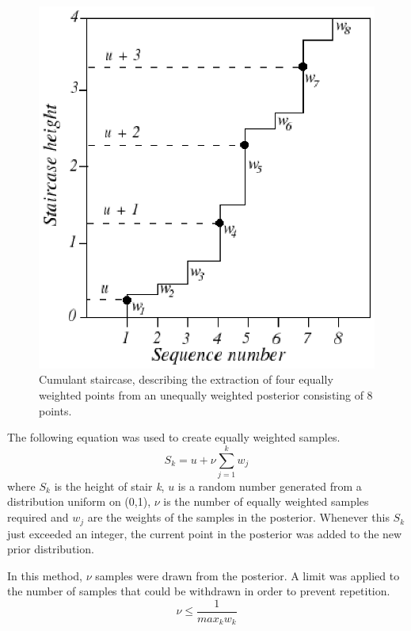 \documentclass[a4paper,12pt]{article}
\begin{document}
\begin{figure}[!h]
 \begin{center}
  \includegraphics[scale=1]{staircase.eps}
  \caption{Cumulant staircase, describing the extraction of four equally weighted points from an unequally weighted posterior consisting of 8 points.\cite{sivia}}
 \end{center}
\end{figure}

The following equation was used to create equally weighted samples.  
\begin{equation}
 S_{k} = u + \nu \sum_{j=1}^{k} w_{j}
\end{equation}
where $S_{k}$ is the height of stair \textit{k}, $u$ is a random number generated from a distribution uniform on (0,1), $\nu$ is the number of equally weighted samples required and $w_{j}$ are the weights of the samples in the posterior.
\newline
Whenever this $S_{k}$ just exceeded an integer, the current point in the posterior was added to the new prior distribution.  

In this method, $\nu$ samples were drawn from the posterior.  A limit was applied to the number of samples that could be withdrawn in order to prevent repetition.
\begin{equation}
 \nu \leq \frac{1}{max_{k} w_{k}}
\end{equation}
\end{document}

